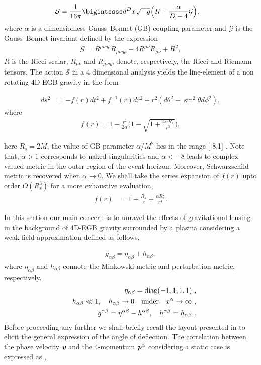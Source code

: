 \documentclass[final,5p,times,twocolumn,unknownkeysallowed]{elsarticle}
\begin{document}
\begin{eqnarray}
\mathcal{S}&=\frac{1}{16\pi}\bigintssss d^Dx\sqrt{-g}\Big(R+\frac{\alpha}{D-4}\mathcal{G}\Big),
\end{eqnarray}
where $\alpha$ is a dimensionless Gauss–Bonnet (GB) coupling parameter and $\mathcal{G}$ is the
Gauss–Bonnet invariant defined by the expression
\begin{align}
\mathcal{G}=R^{\mu\nu\eta\rho}R_{\mu\nu\eta\rho}-4R^{\mu\nu}R_{\mu\nu}+R^2,
\end{align}
$R$ is the Ricci scalar, $R_{\mu\nu}$ and $R_{\mu\nu\eta\rho}$ denote, respectively, the Ricci and
Riemann tensors.
The action $\mathcal{S}$ in a 4 dimensional analysis yields the line-element of a non rotating 4D-EGB gravity
in the form

\begin{align}
 d s^2&=-f(r)dt^2+f^{-1}(r)dr^2+r^2(d\theta^2+\sin^2\theta d\phi^2),
 \end{align}
 where
 \begin{align}
 f(r)=1+\frac{r^2}{2\alpha}\bigg(1-\sqrt{1+\frac{4\alpha R_s}{r^3}}\bigg),
 \end{align}

here $R_s=2M$, the value of GB parameter $\alpha/M^2$ lies in the range [-8,1] \cite{Abu:2020f}. Note that, $\alpha>1$ corresponds to naked singularities
and $\alpha<-8$ leads to complex-valued metric in the outer region of the event horizon\cite{Ming:2020a}. Moreover,
Schwarzschild metric is recovered when $\alpha\rightarrow0$.
We shall take the series expansion of $f(r)$ upto order $O(R^3_s)$ for a more exhaustive evaluation,
\begin{align}
f(r)&=1-\frac{R_s}{r}+\frac{\alpha R^2_s}{r^4}.
\end{align}

In this section our main concern is to unravel the effects of gravitational lensing
in the background of 4D-EGB gravity surrounded by a plasma considering a weak-field approximation defined as follows,

\begin{align}
g_{\alpha\beta}=\eta_{\alpha\beta}+h_{\alpha\beta},
\end{align}
where $\eta_{\alpha\beta}$ and $h_{\alpha\beta}$ connote the Minkowski metric and perturbation metric, respectively.
\begin{eqnarray}
&&\eta_{\alpha\beta} = {\rm diag} (-1, 1, 1, 1)\ ,\nonumber\\
&& h_{\alpha\beta} \ll 1, \quad  h_{\alpha\beta} \rightarrow 0 \quad {\rm under } \quad x^{\alpha}\rightarrow \infty\ , \nonumber \\
&& g^{\alpha\beta}=\eta^{\alpha\beta}-h^{\alpha\beta},\ \ \ h^{\alpha\beta}=h_{\alpha\beta}\ .
\end{eqnarray}
Before proceeding any further we shall briefly recall the layout presented in \cite{Bin:2010a,Abu:2013a,Abu:2017a}
to elicit the general expression of the angle of deflection. The correlation between the phase velocity
$\textit{\textbf{v}}$ and the 4-momentum $\textit{\textbf{p}}^\alpha$ considering a static case is expressed as \cite{Synge:1960b},
\end{document}
